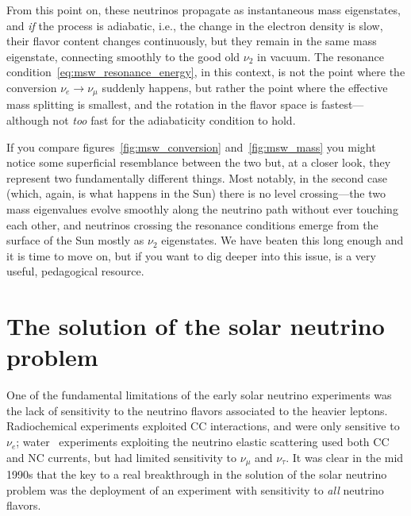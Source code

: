 From this point on, these neutrinos propagate as instantaneous mass eigenstates,
and \emph{if} the process is adiabatic, i.e., the change in the electron density
is slow, their flavor content changes continuously, but they remain in the same
mass eigenstate, connecting smoothly to the good old $\nu_2$ in vacuum.
The resonance condition~\eqref{eq:msw_resonance_energy}, in this context, is
not the point where the conversion $\nu_e \rightarrow \nu_\mu$ suddenly happens,
but rather the point where the effective mass splitting is smallest, and the
rotation in the flavor space is fastest---although not \emph{too} fast for the
adiabaticity condition to hold.

If you compare figures~\ref{fig:msw_conversion} and~\ref{fig:msw_mass} you might
notice some superficial resemblance between the two but, at a closer look, they
represent two fundamentally different things. Most notably, in the second case
(which, again, is what happens in the Sun) there is no level crossing---the
two mass eigenvalues evolve smoothly along the neutrino path without ever
touching each other, and neutrinos crossing the resonance conditions emerge from
the surface of the Sun mostly as $\nu_2$ eigenstates. We have beaten this long
enough and it is time to move on, but if you want to dig deeper into this issue,
\cite{2001hep.ph....6042F} is a very useful, pedagogical resource.



\section{The solution of the solar neutrino problem}
\label{sec:nu_solar_solution}

One of the fundamental limitations of the early solar neutrino experiments was the
lack of sensitivity to the neutrino flavors associated to the heavier leptons.
Radiochemical experiments exploited CC interactions, and were only sensitive
to $\nu_e$; water \cherenkov\ experiments exploiting the neutrino elastic scattering
used both CC and NC currents, but had limited sensitivity to $\nu_\mu$ and $\nu_\tau$.
It was clear in the mid 1990s that the key to a real breakthrough in the solution of
the solar neutrino problem was the deployment of an experiment with sensitivity to
\emph{all} neutrino flavors.


